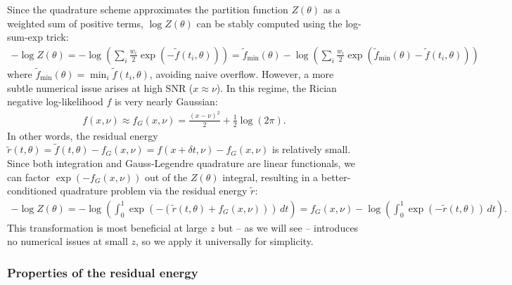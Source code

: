\documentclass{article}
\begin{document}
Since the quadrature scheme approximates the partition function $Z(\theta)$ as a weighted sum of positive terms, $\log Z(\theta)$ can be stably computed using the log-sum-exp trick:
%
\begin{align}
  -\log Z(\theta)
  = -\log\left(\sum_i \frac{w_i}{2} \exp(-\tilde{f}(t_i, \theta))\right)
  = \tilde{f}_{\min}(\theta) - \log\left(\sum_i \frac{w_i}{2} \exp(\tilde{f}_{\min}(\theta) - \tilde{f}(t_i, \theta))\right)
\end{align}
%
where $\tilde{f}_{\min}(\theta) = \min_i \tilde{f}(t_i, \theta)$, avoiding naive overflow.
However, a more subtle numerical issue arises at high SNR ($x \approx \nu$).
In this regime, the Rician negative log-likelihood $f$ is very nearly Gaussian:
%
\begin{align}
  f(x, \nu) \approx f_G(x,\nu) = \frac{(x-\nu)^2}{2} + \frac{1}{2}\log(2\pi).
\end{align}
%
In other words, the residual energy $\tilde{r}(t,\theta) = \tilde{f}(t,\theta) - f_G(x,\nu) = f(x + \delta t, \nu) - f_G(x,\nu)$ is relatively small.
Since both integration and Gauss-Legendre quadrature are linear functionals, we can factor $\exp(-f_G(x,\nu))$ out of the $Z(\theta)$ integral, resulting in a better-conditioned quadrature problem via the residual energy $\tilde{r}$:
%
\begin{align}
  -\log Z(\theta)
  = - \log\left(\int_0^1 \exp(-(\tilde{r}(t,\theta) + f_G(x,\nu))) \, dt \right)
  = f_G(x,\nu) - \log\left(\int_0^1 \exp(-\tilde{r}(t,\theta)) \, dt \right). \label{eq:logz-residual-derivation}
\end{align}
%
This transformation is most beneficial at large $z$ but -- as we will see -- introduces no numerical issues at small $z$, so we apply it universally for simplicity.

\subsubsection{Properties of the residual energy}
\end{document}

